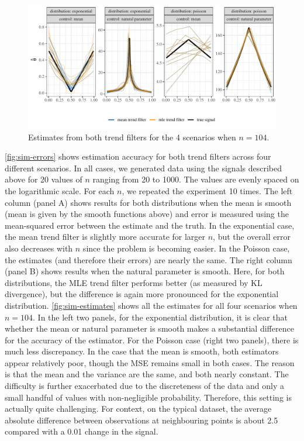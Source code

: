 \documentclass[ejs,noshowframe]{imsart}
\theoremstyle{plain}
\theoremstyle{definition}
\begin{document}
\begin{figure}[t]
  \centering
  \includegraphics[width=.9\textwidth]{show-estimate.pdf}
  \caption{Estimates from both trend filters for the 4 scenarios when 
  $n=104$.}
  \label{fig:sim-estimates}
\end{figure}

\autoref{fig:sim-errors} shows estimation accuracy for both trend filters across
four different scenarios. In all cases, we generated data using the signals
described above for 20 values of $n$ ranging from 20 to 1000. The values are
evenly spaced on the logarithmic scale. For each $n$, we repeated the experiment
10 times. The left column (panel A) shows results for both distributions when
the mean is smooth (mean is given by the smooth functions above) and error is 
measured using the mean-squared error
between the estimate and the truth. In the exponential case, the mean trend
filter is slightly more accurate for larger $n$, but the overall error also
decreases with $n$ since the problem is becoming easier. In the Poisson case,
the estimates (and therefore their errors) are nearly the same. The right column
(panel B) shows results when 
the natural parameter is smooth. Here, for both distributions, the MLE trend
filter performs better (as measured by KL divergence), but the difference is
again more pronounced for the exponential distribution.
\autoref{fig:sim-estimates} shows all the estimates for all four scenarios when
$n=104$. In the left two panels, for the exponential distribution, it is clear
that whether the mean or natural parameter is smooth makes a substantial
difference for the 
accuracy of the estimator. For the Poisson case (right two panels), there is
much less discrepancy. In the case that the mean is smooth, both estimators
appear relatively poor, though the MSE remains small in both cases. The reason
is that the mean and the variance are the same, and both nearly constant. The
difficulty is further exacerbated due to the discreteness of the data and only
a small handful of values with non-negligible probability. 
Therefore, this setting is actually quite challenging. For context, on the
typical dataset, the average
absolute difference between observations 
at neighbouring points is about 2.5 compared with a 0.01 change in the signal.
\end{document}
